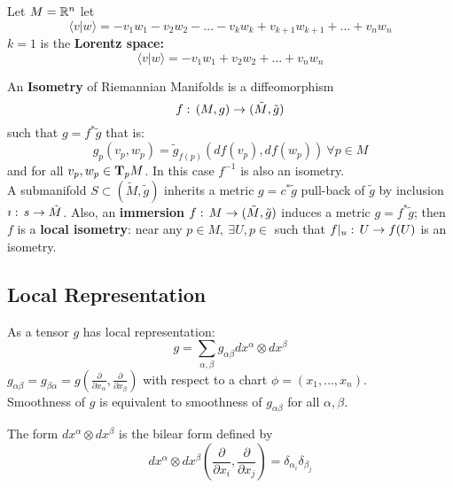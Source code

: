 \begin{examples}
    Let $M=\mathbb{R}^n$ let 
    $$\langle v|w\rangle = -v_1w_1 - v_2w_2-\ldots - v_kw_k + v_{k+1}w_{k+1} + \ldots + v_nw_n$$
    $k=1$ is the \textbf{Lorentz space:}
    $$\langle v|w\rangle = -v_1w_1 + v_2w_2 + \ldots + v_nw_n$$
\end{examples}

\begin{ddef}
    An \textbf{Isometry} of Riemannian Manifolds is a diffeomorphism
    $$f:\, (M,g) \to (\tilde M, \tilde g)$$
    such that $g= f^* \tilde g$ that is:
    $$g_p(v_p,w_p) = \tilde g_{f(p)} (df(v_p), df(w_p))\ \forall p\in M$$
    and for all $v_p, w_p\in \text{\textbf{T}}_pM$. In this case $f^{-1}$ is also an isometry.\\
    A submanifold $S\subset (\tilde M, \tilde g)$ inherits a metric $g= c^*\tilde g$ pull-back of $\tilde g$ by inclusion $\imath:\, s\to \tilde M$. Also, an \textbf{immersion} $f:\, M \to (\tilde M, \tilde g)$ induces a metric $g=f^* \tilde g$; then $f$ is a \textbf{local isometry}: near any $p\in M,\ \exists U, p\in $ such that $f|_u :\, U\to f(U) $ is an isometry.
\end{ddef}

\subsection{Local Representation}
As a tensor $g$ has local representation:
$$g= \sum_{\alpha,\beta} g_{\alpha\beta} dx^\alpha \otimes dx^\beta$$
$g_{\alpha\beta} = g_{\beta\alpha} = g(\frac{\partial}{\partial x_\alpha}, \frac{\partial}{\partial x_\beta} )$ with respect to a chart $\phi=(x_1,\ldots, x_n)$.\\
Smoothness of $g$ is equivalent to smoothness of $g_{\alpha\beta}$ for all $\alpha, \beta$.

\begin{ddef}
    The form $dx^\alpha \otimes dx^\beta$ is the bilear form defined by 
    $$dx^\alpha \otimes dx^\beta \left(\frac{\partial}{\partial x_i}, \frac{\partial}{\partial x_j}\right)= \delta_{\alpha_i}\delta_{\beta_j}$$
\end{ddef}

